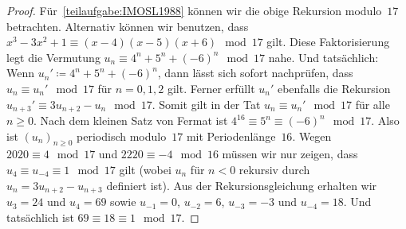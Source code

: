 \begin{proof}
	Für~\ref{teilaufgabe:IMOSL1988} können wir die obige Rekursion modulo~$17$ betrachten. Alternativ können wir benutzen, dass $x^3-3x^2+1\equiv (x-4)(x-5)(x+6)\mod 17$ gilt. Diese Faktorisierung legt die Vermutung $u_n\equiv 4^n+5^n+(-6)^n\mod 17$ nahe. Und tatsächlich: Wenn $u_n'\coloneqq 4^n+5^n+(-6)^n$, dann lässt sich sofort nachprüfen, dass $u_n\equiv u_n'\mod 17$ für $n=0,1,2$ gilt. Ferner erfüllt $u_n'$ ebenfalls die Rekursion $u_{n+3}'\equiv 3u_{n+2}-u_n\mod 17$. Somit gilt in der Tat $u_n\equiv u_n'\mod 17$ für alle $n\geqslant 0$. Nach dem kleinen Satz von Fermat ist $4^{16}\equiv 5^n\equiv (-6)^n\mod 17$. Also ist $(u_n)_{n\geqslant 0}$ periodisch modulo~$17$ mit Periodenlänge~$16$. Wegen $2020\equiv 4\mod 17$ und $2220\equiv -4\mod 16$ müssen wir nur zeigen, dass $u_4\equiv u_{-4}\equiv 1\mod 17$ gilt (wobei $u_n$ für $n<0$ rekursiv durch $u_n=3u_{n+2}-u_{n+3}$ definiert ist). Aus der Rekursionsgleichung erhalten wir $u_3=24$ und $u_4=69$ sowie $u_{-1}=0$, $u_{-2}=6$, $u_{-3}=-3$ und $u_{-4}=18$. Und tatsächlich ist $69\equiv 18\equiv 1\mod 17$.
\end{proof}

